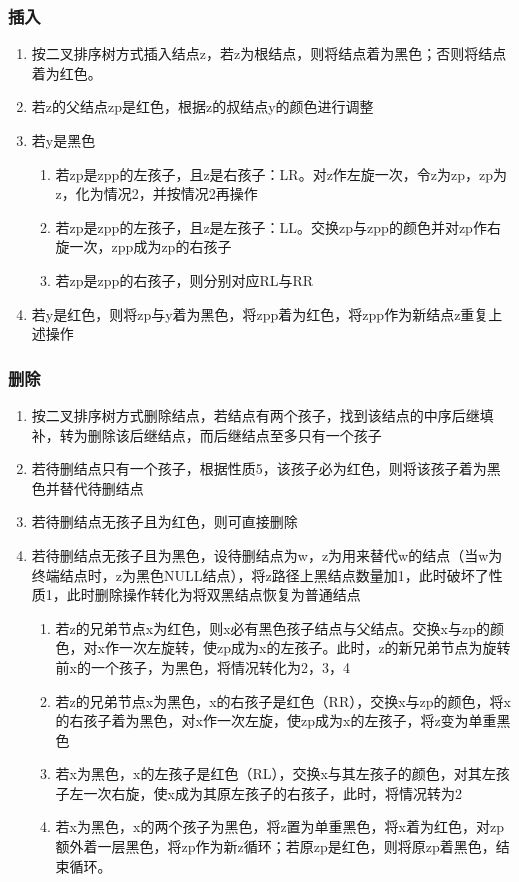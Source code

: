 \subsubsection{插入}
\begin{enumerate}
    \item 按二叉排序树方式插入结点z，若z为根结点，则将结点着为黑色；否则将结点着为红色。
    \item 若z的父结点zp是红色，根据z的叔结点y的颜色进行调整
    \item 若y是黑色\begin{enumerate}
        \item 若zp是zpp的左孩子，且z是右孩子：LR。对z作左旋一次，令z为zp，zp为z，化为情况2，并按情况2再操作
        \item 若zp是zpp的左孩子，且z是左孩子：LL。交换zp与zpp的颜色并对zp作右旋一次，zpp成为zp的右孩子
        \item 若zp是zpp的右孩子，则分别对应RL与RR
    \end{enumerate}
    \item 若y是红色，则将zp与y着为黑色，将zpp着为红色，将zpp作为新结点z重复上述操作
\end{enumerate}


\subsubsection{删除}
\begin{enumerate}
    \item 按二叉排序树方式删除结点，若结点有两个孩子，找到该结点的中序后继填补，转为删除该后继结点，而后继结点至多只有一个孩子
    \item 若待删结点只有一个孩子，根据性质5，该孩子必为红色，则将该孩子着为黑色并替代待删结点
    \item 若待删结点无孩子且为红色，则可直接删除
    \item 若待删结点无孩子且为黑色，设待删结点为w，z为用来替代w的结点（当w为终端结点时，z为黑色NULL结点），将z路径上黑结点数量加1，此时破坏了性质1，此时删除操作转化为将双黑结点恢复为普通结点\begin{enumerate}
        \item 若z的兄弟节点x为红色，则x必有黑色孩子结点与父结点。交换x与zp的颜色，对x作一次左旋转，使zp成为x的左孩子。此时，z的新兄弟节点为旋转前x的一个孩子，为黑色，将情况转化为2，3，4
        \item 若z的兄弟节点x为黑色，x的右孩子是红色（RR），交换x与zp的颜色，将x的右孩子着为黑色，对x作一次左旋，使zp成为x的左孩子，将z变为单重黑色
        \item 若x为黑色，x的左孩子是红色（RL），交换x与其左孩子的颜色，对其左孩子左一次右旋，使x成为其原左孩子的右孩子，此时，将情况转为2
        \item 若x为黑色，x的两个孩子为黑色，将z置为单重黑色，将x着为红色，对zp额外着一层黑色，将zp作为新z循环；若原zp是红色，则将原zp着黑色，结束循环。
    \end{enumerate}
\end{enumerate}


